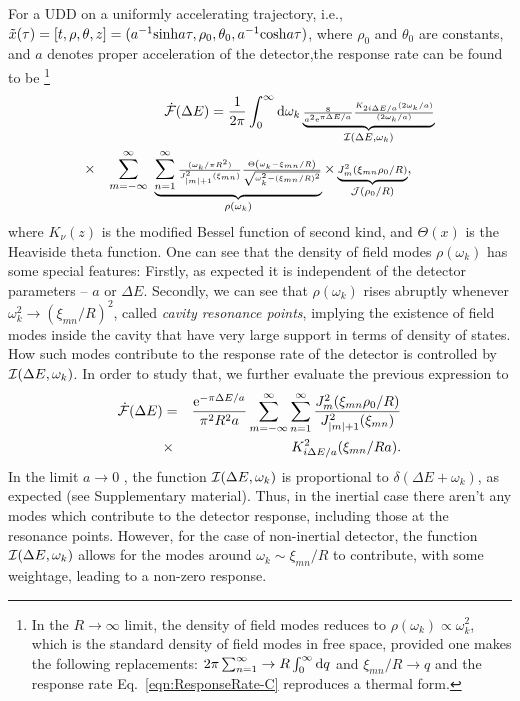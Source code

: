 \documentclass[aps,prl,nofootinbib,preprintnumbers,floatfix,twocolumn,superscriptaddress]{revtex4}
\def\nn{\nonumber}
\def\nn{\nonumber}
\def\l{\left}
\def\r{\right}
\def\d{{\rm d}}
\def\f{\frac}
\def\e{{\rm e}}
\begin{document}
For a UDD on a uniformly accelerating trajectory, i.e.,
${\tilde x}(\tau)=[t,\rho,\theta,z]
=(a^{-1}{\rm sinh}a\tau,\rho_0,\theta_0,a^{-1}{\rm cosh}a\tau)$,
where $\rho_0$ and $\theta_0$ are constants, and $a$ denotes proper acceleration of 
the detector,the response rate can be found to be 
\footnote{In the $R \to \infty$ limit, the density of field modes 
reduces to $\rho(\omega_{k}) \propto \omega_k^2$, which is the standard 
density of field modes in free space, provided one makes the following 
replacements: $2\pi \sum_{n=1}^{\infty} \to R\int_{0}^{\infty} \d q$ and 
$\xi_{mn}/R \to q$ and the response rate Eq.~\eqref{eqn:ResponseRate-C} reproduces a thermal form.}
\begin{eqnarray}
\label{Eq:AclrtdResponse}
 & & {\dot {\cal F}}(\Delta E)=\f{1}{2\pi} 
 \int_{0}^{\infty} \d \omega_{k} 
 \underbrace{{\scriptstyle \f{8}{a^2 \e^{\pi \Delta E/a}}
 \frac{K_{2i\Delta E/a}(2 \omega_k/a)}{(2 \omega_k/a)}}} 
 _{{\cal I}(\Delta E,\omega_{k})} \nn \\
 &\times& \sum_{m=-\infty}^{\infty} ~ 
 \underbrace{\sum_{n=1}^{\infty} {\scriptstyle \f{(\omega_k/\pi R^2)}{J^2_{|m|+1}(\xi_{mn})}
 \f{\Theta\l(\omega_k-\xi_{mn}/R\r)}{\sqrt{\omega_k^2-(\xi_{mn}/R)^2}}}}
 _{\rho(\omega_{k})}
 \times 
 \underbrace{{\scriptstyle J_{m}^2(\xi_{mn} \rho_0/R)}}
 _{{\cal J}(\rho_0/R)}, ~~~~~
\end{eqnarray}
where $K_{\nu}(z)$ is the modified Bessel function of second kind, and
$\Theta(x)$ is the Heaviside theta function. One can see that the density of 
field modes $\rho(\omega_k)$ 
has some special features: Firstly, as expected it is independent of the detector parameters -- 
$a$ or $\Delta E$.
Secondly, we can see that $\rho(\omega_k)$ rises abruptly whenever 
$\omega_k^2 \rightarrow (\xi_{mn}/R)^2$, called {\it cavity resonance points},  implying 
the existence of field modes inside the cavity that have very 
large support in terms of 
density of states. How such modes contribute to the 
response rate of the detector is controlled by 
${\cal I}(\Delta E,\omega_{k})$. In order to study that, we further 
evaluate the previous expression to 
\begin{eqnarray}
\label{eqn:ResponseRate-C}
 {\dot {\cal F}}(\Delta E)
 &=& \f{\e^{-\pi \Delta E/a}}{\pi^2 R^2a} 
 \sum_{m=-\infty}^{\infty} \sum_{n=1}^{\infty}
 \f{J_{m}^2(\xi_{mn} \rho_0/R)}{J^2_{|m|+1}(\xi_{mn})} \nn \\
 &\times& K_{i\Delta E/a}^2(\xi_{mn}/Ra).
\end{eqnarray}
In the limit $a\rightarrow 0$ , the function ${\cal I}(\Delta E,\omega_{k})$ 
is proportional to $\delta(\Delta E +\omega_{k})$, as expected (see Supplementary material). 
Thus, in the inertial case 
there  aren't any modes which contribute to the detector response, 
including those at the resonance points. 
However, for the case of
non-inertial detector, the function ${\cal I}(\Delta E,\omega_{k})$ allows for 
the modes around $\omega_k \sim \xi_{mn}/R$ to contribute, with some weightage, 
leading to a non-zero response.
\end{document}
